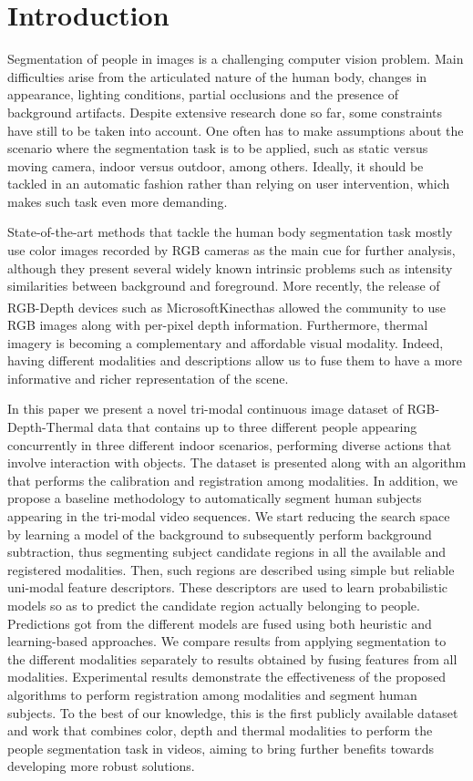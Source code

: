\documentclass[10pt,twocolumn,letterpaper]{article}
\begin{document}
\section{Introduction}
\label{sec:introduction}
Segmentation of people in images is a challenging computer vision problem. Main difficulties arise from the articulated nature of the human body, changes in appearance, lighting conditions, partial occlusions and the presence of background artifacts. Despite extensive research done so far, some constraints have still to be taken into account. One often has to make assumptions about the scenario where the segmentation task is to be applied, such as static versus moving camera, indoor versus outdoor, among others. Ideally, it should be tackled in an automatic fashion rather than relying on user intervention, which makes such task even more demanding. 

State-of-the-art methods that tackle the human body segmentation task mostly use color images recorded by RGB cameras as the main cue for further analysis, although they present several widely known intrinsic problems such as intensity similarities between background and foreground. More recently, the release of RGB-Depth devices such as Microsoft\textsuperscript\textregistered Kinect\textsuperscript\texttrademark has allowed the community to use RGB images along with per-pixel depth information. Furthermore, thermal imagery is becoming a complementary and affordable visual modality. Indeed, having different modalities and descriptions allow us to fuse them to have a more informative and richer representation of the scene. 

In this paper we present a novel tri-modal continuous image dataset of RGB-Depth-Thermal data that contains up to three different people appearing concurrently in three different indoor scenarios, performing diverse actions that involve interaction with objects. The dataset is presented along with an algorithm that performs the calibration and registration among modalities. In addition, we propose a baseline methodology to automatically segment human subjects appearing in the tri-modal video sequences. We start reducing the search space by learning a model of the background to subsequently perform background subtraction, thus segmenting subject candidate regions in all the available and registered modalities. Then, such regions are described using simple but reliable uni-modal feature descriptors. These descriptors are used to learn probabilistic models so as to predict the candidate region actually belonging to people. Predictions got from the different models are fused using both heuristic and learning-based approaches. We compare results from applying segmentation to the different modalities separately to results obtained by fusing features from all modalities. Experimental results demonstrate the effectiveness of the proposed algorithms to perform registration among modalities and segment human subjects. To the best of our knowledge, this is the first publicly available dataset and work that combines color, depth and thermal modalities to perform the people segmentation task in videos, aiming to bring further benefits towards developing more robust solutions.
\end{document}
